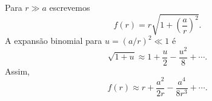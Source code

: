 Para $r\gg a$ escrevemos
\[
f(r)=r\sqrt{1+\left(\frac{a}{r}\right)^{2}}.
\]
A expansão binomial para $u=(a/r)^{2}\ll1$ é
\[
\sqrt{1+u} \approx 1 + \frac{u}{2} - \frac{u^{2}}{8} + \cdots.
\]
Assim,
\[
f(r) \approx r + \frac{a^{2}}{2r} - \frac{a^{4}}{8r^{3}} + \cdots.
\]